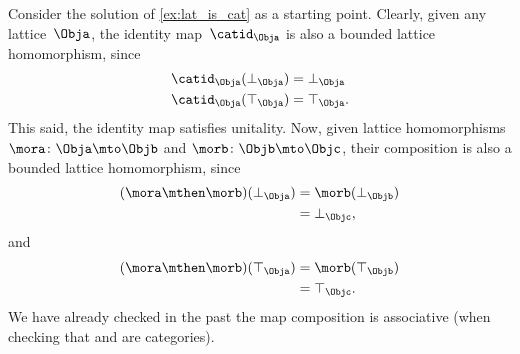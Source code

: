 \begin{solution}
	Consider the solution of \cref{ex:lat_is_cat} as a starting point.
	Clearly, given any lattice~$\Obja$, the identity map~$\catid_\Obja$ is also a bounded lattice homomorphism, since
	\begin{equation*}
		\begin{aligned}
			\catid_\Obja(\bot_\Obja) & =\bot_\Obja  \\
			\catid_\Obja(\top_\Obja) & =\top_\Obja.
		\end{aligned}
	\end{equation*}
	This said, the identity map satisfies unitality.
	Now, given lattice homomorphisms $\mora\colon \Obja \mto \Objb$ and  $\morb\colon \Objb\mto \Objc$, their composition is also a bounded lattice homomorphism, since
	\begin{equation*}
		\begin{aligned}
			(\mora \mthen \morb)(\bot_\Obja)
			 & = \morb(\bot_\Objb) \\
			 & = \bot_\Objc,
		\end{aligned}
	\end{equation*}
	and
	\begin{equation*}
		\begin{aligned}
			(\mora \mthen \morb)(\top_\Obja)
			 & = \morb(\top_\Objb) \\
			 & = \top_\Objc.
		\end{aligned}
	\end{equation*}
	We have already checked in the past the map composition is associative (\eg when checking that \Set and \Pos are categories).
\end{solution}

